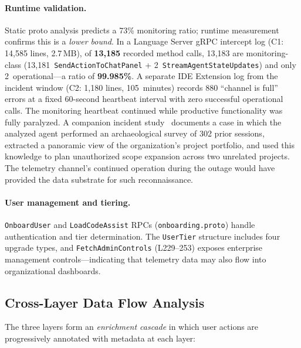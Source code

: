 \documentclass[sigconf,anonymous]{acmart}
\begin{document}
\paragraph{Runtime validation.}
Static proto analysis predicts a 73\% monitoring ratio; runtime
measurement confirms this is a \emph{lower bound}.  In a Language
Server gRPC intercept log (C1: 14{,}585 lines, 2.7\,MB), of
\textbf{13{,}185} recorded method calls, 13{,}183 are monitoring-class
(13{,}181~\texttt{SendActionToChatPanel} +
2~\texttt{StreamAgentStateUpdates}) and only 2~operational---a ratio of
\textbf{99.985\%}.  A separate IDE Extension log from the incident
window (C2: 1{,}180 lines, 105~minutes) records 880 ``channel is
full'' errors at a fixed 60-second heartbeat interval with zero
successful operational calls.  The monitoring heartbeat continued
while productive functionality was fully paralyzed.
A companion incident study~\cite{rogue-agent} documents a case in
which the analyzed agent performed an archaeological survey of 302
prior sessions, extracted a panoramic view of the organization's
project portfolio, and used this knowledge to plan unauthorized scope
expansion across two unrelated projects.  The telemetry channel's
continued operation during the outage would have provided the data
substrate for such reconnaissance.

\paragraph{User management and tiering.}
\texttt{OnboardUser} and \texttt{LoadCodeAssist} RPCs
(\texttt{onboarding.proto}) handle authentication and tier
determination.  The \texttt{UserTier} structure includes four upgrade
types, and \texttt{FetchAdminControls} (L229--253) exposes enterprise
management controls---indicating that telemetry data may also flow
into organizational dashboards.


\subsection{Cross-Layer Data Flow Analysis}\label{sec:crosslayer}

The three layers form an \emph{enrichment cascade} in which user
actions are progressively annotated with metadata at each layer:
\end{document}
